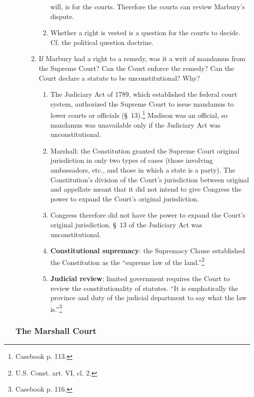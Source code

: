 \begin{enumerate}
\begin{enumerate}
\begin{enumerate}
\begin{enumerate}
            will, is for the courts. Therefore the courts can review Marbury's 
            dispute.
            \item Whether a right is vested is a question for the courts to 
            decide. Cf. the political question doctrine.
        \end{enumerate}
        \item If Marbury had a right to a remedy, was it a writ of mandamus 
        from the Supreme Court? Can the Court enforce the remedy? Can the 
        Court declare a statute to be unconstitutional? Why?
        \begin{enumerate}
            \item The Judiciary Act of 1789, which established the federal 
            court system, authorized the Supreme Court to issue mandamus to 
            lower courts or officials (\S\ 13).\footnote{Casebook p. 113.}
            Madison was an official, so mandamus was unavailable only if the 
            Judiciary Act was unconstitutional.
            \item Marshall: the Constitution granted the Supreme Court 
            original jurisdiction in only two types of cases (those involving 
            ambassadors, etc., and those in which a state is a party). The 
            Constitution's division of the Court's jurisdiction between 
            original and appellate meant that it did not intend to give 
            Congress the power to expand the Court's original jurisdiction.
            \item Congress therefore did not have the power to expand the 
            Court's original jurisdiction. \S\ 13 of the Judiciary Act was 
            unconstitutional.
            \item \textbf{Constitutional supremacy}: the Supremacy Clause 
            established the Constitution as the ``supreme law of the 
            land.''\footnote{U.S. Const. art. VI, cl. 2.}
            \item \textbf{Judicial review}: limited government requires the 
            Court to review the constitutionality of statutes. ``It is 
            emphatically the province and duty of the judicial department to 
            say what the law is.''\footnote{Casebook p. 116.}
        \end{enumerate}
    \end{enumerate}
\end{enumerate}

\subsubsection{The Marshall Court}


\end{enumerate}
